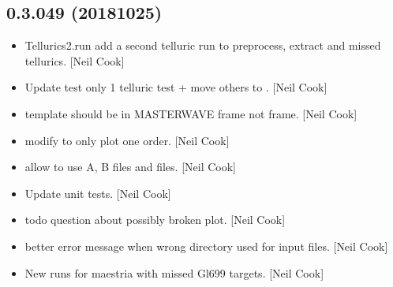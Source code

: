 \documentclass[a4paper,10pt,english]{report}
\begin{document}
\subsection{0.3.049 (2018\sphinxhyphen{}10\sphinxhyphen{}25)}
\label{\detokenize{misc/changelog:id302}}\begin{itemize}
\item {} 
Tellurics2.run \sphinxhyphen{} add a second telluric run \sphinxhyphen{} to preprocess, extract
and  missed tellurics. {[}Neil Cook{]}

\item {} 
Update test \sphinxhyphen{} only 1 telluric test + move others to . {[}Neil
Cook{]}

\item {} 
 \sphinxhyphen{} template should be in MASTERWAVE frame not 
frame. {[}Neil Cook{]}

\item {} 
 \sphinxhyphen{} modify  to only plot one
order. {[}Neil Cook{]}

\item {} 
 \sphinxhyphen{} allow  to use A, B files
and  files. {[}Neil Cook{]}

\item {} 
Update unit tests. {[}Neil Cook{]}

\item {} 
 \sphinxhyphen{} todo question about possibly broken plot. {[}Neil
Cook{]}

\item {} 
 \sphinxhyphen{} better error message when wrong directory used for
input files. {[}Neil Cook{]}

\item {} 
New  runs for maestria with missed Gl699 targets. {[}Neil Cook{]}

\end{itemize}
\end{document}

